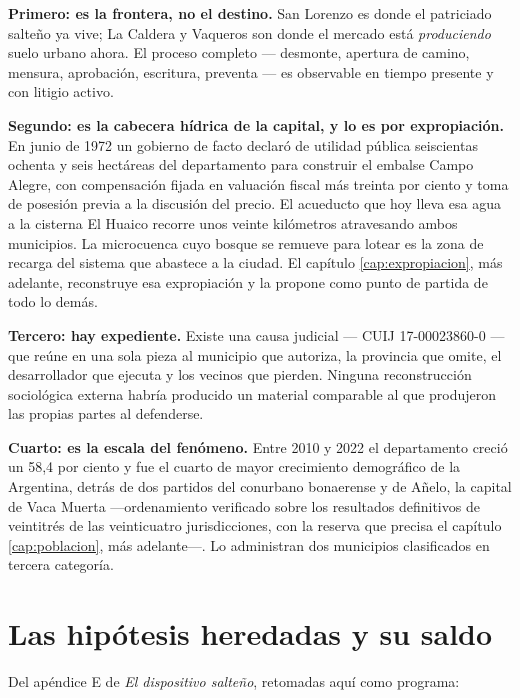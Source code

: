 \textbf{Primero: es la frontera, no el destino.} San Lorenzo es donde el patriciado salteño ya vive; La Caldera y Vaqueros son donde el mercado está \textit{produciendo} suelo urbano ahora. El proceso completo --- desmonte, apertura de camino, mensura, aprobación, escritura, preventa --- es observable en tiempo presente y con litigio activo.

\textbf{Segundo: es la cabecera hídrica de la capital, y lo es por expropiación.} En junio de 1972 un gobierno de facto declaró de utilidad pública seiscientas ochenta y seis hectáreas del departamento para construir el embalse Campo Alegre, con compensación fijada en valuación fiscal más treinta por ciento y toma de posesión previa a la discusión del precio. El acueducto que hoy lleva esa agua a la cisterna El Huaico recorre unos veinte kilómetros atravesando ambos municipios. La microcuenca cuyo bosque se remueve para lotear es la zona de recarga del sistema que abastece a la ciudad. El capítulo \ref{cap:expropiacion}, más adelante, reconstruye esa expropiación y la propone como punto de partida de todo lo demás.

\textbf{Tercero: hay expediente.} Existe una causa judicial --- CUIJ 17-00023860-0 --- que reúne en una sola pieza al municipio que autoriza, la provincia que omite, el desarrollador que ejecuta y los vecinos que pierden. Ninguna reconstrucción sociológica externa habría producido un material comparable al que produjeron las propias partes al defenderse.

\textbf{Cuarto: es la escala del fenómeno.} Entre 2010 y 2022 el departamento creció un 58,4 por ciento y fue el cuarto de mayor crecimiento demográfico de la Argentina, detrás de dos partidos del conurbano bonaerense y de Añelo, la capital de Vaca Muerta ---ordenamiento verificado sobre los resultados definitivos de veintitrés de las veinticuatro jurisdicciones, con la reserva que precisa el capítulo \ref{cap:poblacion}, más adelante---. Lo administran dos municipios clasificados en tercera categoría.

\section{Las hipótesis heredadas y su saldo}

Del apéndice E de \textit{El dispositivo salteño}, retomadas aquí como programa:


